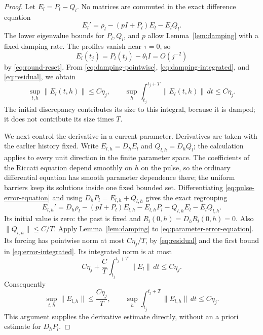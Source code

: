 \begin{proof}
Let \(E_l=P_l-Q_l\).  No matrices are commuted in the exact
difference equation
\begin{equation}
 E_l'=\rho_l-(pI+P_l)E_l-E_lQ_l.
 \label{eq:pulse-error-equation}
\end{equation}
The lower eigenvalue bounds for \(P_l,Q_l\), and \(p\) allow
Lemma~\ref{lem:damping} with a fixed damping rate.  The profiles
vanish near \(\tau=0\), so
\[
 E_l(t_j)=P_l(t_j)-\theta_lI=O(j^{-2})
\]
by \eqref{eq:round-reset}.  From
\eqref{eq:damping-pointwise}, \eqref{eq:damping-integrated}, and
\eqref{eq:residual}, we obtain
\begin{equation}
 \sup_{t,h}\|E_l(t,h)\|\leq C\eta_j,\qquad
 \sup_h\int_{t_j}^{t_j+T}\|E_l(t,h)\|\,dt\leq C\eta_j.
 \label{eq:error-integrated}
\end{equation}
The initial discrepancy contributes its size to this integral,
because it is damped; it does not contribute its size times \(T\).

We next control the derivative in a current parameter.  Derivatives
are taken with the earlier history fixed.  Write
\(E_{l,h}=D_hE_l\) and \(Q_{l,h}=D_hQ_l\); the calculation applies
to every unit direction in the finite parameter space.
The coefficients of the Riccati equation depend smoothly on \(h\)
on the pulse, so the ordinary differential equation has smooth
parameter dependence there; the uniform barriers keep its solutions
inside one fixed bounded set.
Differentiating \eqref{eq:pulse-error-equation} and using
\(D_hP_l=E_{l,h}+Q_{l,h}\) gives the exact regrouping
\begin{equation}
 E_{l,h}'=D_h\rho_l
 -(pI+P_l)E_{l,h}-E_{l,h}P_l
 -Q_{l,h}E_l-E_lQ_{l,h}.
 \label{eq:parameter-error-equation}
\end{equation}
Its initial value is zero: the past is fixed and
\(R_l(0,h)=D_hR_l(0,h)=0\).  Also
\(\|Q_{l,h}\|\leq C/T\).  Apply Lemma~\ref{lem:damping} to
\eqref{eq:parameter-error-equation}.  Its forcing has pointwise
norm at most \(C\eta_j/T\), by \eqref{eq:residual} and the first
bound in \eqref{eq:error-integrated}.  Its integrated norm is at
most
\[
 C\eta_j+\frac{C}{T}
   \int_{t_j}^{t_j+T}\|E_l\|\,dt
 \leq C\eta_j.
\]
Consequently
\begin{equation}
 \sup_{t,h}\|E_{l,h}\|\leq\frac{C\eta_j}{T},\qquad
 \sup_h\int_{t_j}^{t_j+T}\|E_{l,h}\|\,dt\leq C\eta_j.
 \label{eq:parameter-error-integrated}
\end{equation}
This argument supplies the derivative estimate directly, without
an a priori estimate for \(D_hP_l\).


\end{proof}
